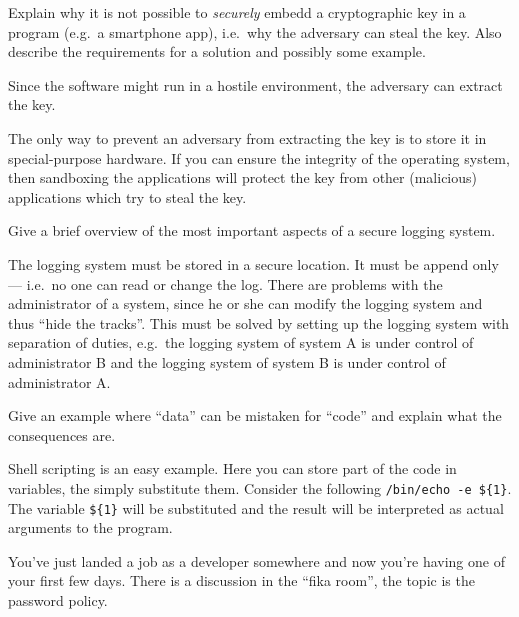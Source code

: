 \question[3]
  Explain why it is not possible to \emph{securely} embedd a cryptographic key 
  in a program (e.g.\ a smartphone app), i.e.\ why the adversary can steal the 
  key.
  Also describe the requirements for a solution and possibly some example.

  \begin{solution}
    Since the software might run in a hostile environment, the adversary can 
    extract the key.

    The only way to prevent an adversary from extracting the key is to store it 
    in special-purpose hardware.
    If you can ensure the integrity of the operating system, then sandboxing 
    the applications will protect the key from other (malicious) applications 
    which try to steal the key.
  \end{solution}

\question[3]\label{q:accountability}
Give a brief overview of the most important aspects of a secure logging system.

\begin{solution}
  The logging system must be stored in a secure location.
  It must be append only --- i.e.\ no one can read or change the log.
  There are problems with the administrator of a system, since he or she can 
  modify the logging system and thus \enquote{hide the tracks}.
  This must be solved by setting up the logging system with separation of 
  duties, e.g.\ the logging system of system A is under control of 
  administrator B and the logging system of system B is under control of 
  administrator A.
\end{solution}


\question[3]\label{q:software}
Give an example where \enquote{data} can be mistaken for \enquote{code} and 
explain what the consequences are.

\begin{solution}
  Shell scripting is an easy example.
  Here you can store part of the code in variables, the simply substitute them.
  Consider the following \texttt{/bin/echo -e \$\{1\}}.
  The variable \texttt{\$\{1\}} will be substituted and the result will be 
  interpreted as actual arguments to the program.
\end{solution}


\question[3]
You've just landed a job as a developer somewhere and now you're having one of 
your first few days.
There is a discussion in the \enquote{fika room}, the topic is the password 
policy.

